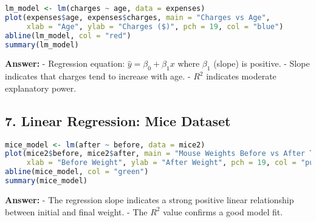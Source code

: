 \documentclass{article}
\begin{document}
\begin{lstlisting}[language=R]
lm_model <- lm(charges ~ age, data = expenses)
plot(expenses$age, expenses$charges, main = "Charges vs Age",
     xlab = "Age", ylab = "Charges ($)", pch = 19, col = "blue")
abline(lm_model, col = "red")
summary(lm_model)
\end{lstlisting}

\textbf{Answer:}  
- Regression equation: $\hat{y} = \beta_0 + \beta_1 x$ where $\beta_1$ (slope) is positive.  
- Slope indicates that charges tend to increase with age.  
- $R^2$ indicates moderate explanatory power.

\subsection*{7. Linear Regression: Mice Dataset}

\begin{lstlisting}[language=R]
mice_model <- lm(after ~ before, data = mice2)
plot(mice2$before, mice2$after, main = "Mouse Weights Before vs After Treatment",
     xlab = "Before Weight", ylab = "After Weight", pch = 19, col = "purple")
abline(mice_model, col = "green")
summary(mice_model)
\end{lstlisting}

\textbf{Answer:}  
- The regression slope indicates a strong positive linear relationship between initial and final weight.  
- The $R^2$ value confirms a good model fit.
\end{document}
